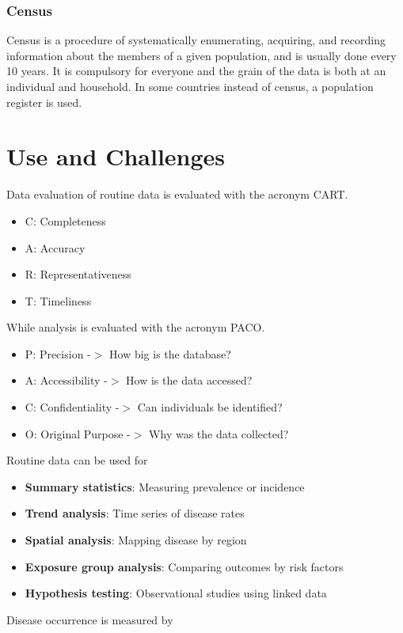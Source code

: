 \documentclass{article}
\begin{document}
\subsubsection*{Census}
Census is a procedure of systematically enumerating, acquiring, and recording information about the members of a given population, and is usually done every 10 years. It is compulsory for everyone and the grain of the data is both at an individual and household. In some countries instead of census, a population register is used.

\section{Use and Challenges}
Data evaluation of routine data is evaluated with the acronym CART.
\begin{itemize}
    \item C: Completeness
    \item A: Accuracy
    \item R: Representativeness
    \item T: Timeliness
\end{itemize}
While analysis is evaluated with the acronym PACO.
\begin{itemize}
    \item P: Precision -$>$ How big is the database?
    \item A: Accessibility -$>$ How is the data accessed?
    \item C: Confidentiality -$>$ Can individuals be identified?
    \item O: Original Purpose -$>$ Why was the data collected?
\end{itemize}
Routine data can be used for
\begin{itemize}
    \item \textbf{Summary statistics}: Measuring prevalence or incidence
    \item \textbf{Trend analysis}: Time series of disease rates
    \item \textbf{Spatial analysis}: Mapping disease by region
    \item \textbf{Exposure group analysis}: Comparing outcomes by risk factors
    \item \textbf{Hypothesis testing}: Observational studies using linked data
\end{itemize}
Disease occurrence is measured by
\end{document}
